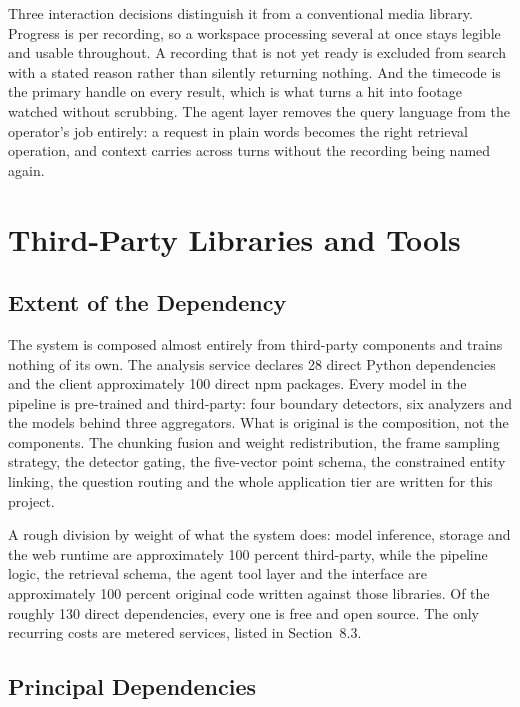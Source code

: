 \documentclass[11pt,a4paper]{article}
\begin{document}
Three interaction decisions distinguish it from a conventional media library.
Progress is per recording, so a workspace processing several at once stays
legible and usable throughout. A recording that is not yet ready is excluded
from search with a stated reason rather than silently returning nothing. And the
timecode is the primary handle on every result, which is what turns a hit into
footage watched without scrubbing. The agent layer removes the query language
from the operator's job entirely: a request in plain words becomes the right
retrieval operation, and context carries across turns without the recording
being named again.

\section{Third-Party Libraries and Tools}

\subsection{Extent of the Dependency}

The system is composed almost entirely from third-party components and trains
nothing of its own. The analysis service declares 28 direct Python dependencies
and the client approximately 100 direct npm packages. Every model in the
pipeline is pre-trained and third-party: four boundary detectors, six analyzers
and the models behind three aggregators. What is original is the composition,
not the components. The chunking fusion and weight redistribution, the frame
sampling strategy, the detector gating, the five-vector point schema, the
constrained entity linking, the question routing and the whole application tier
are written for this project.

A rough division by weight of what the system does: model inference, storage and
the web runtime are approximately 100 percent third-party, while the pipeline
logic, the retrieval schema, the agent tool layer and the interface are
approximately 100 percent original code written against those libraries. Of the
roughly 130 direct dependencies, every one is free and open source. The only
recurring costs are metered services, listed in Section~8.3.

\subsection{Principal Dependencies}
\end{document}
